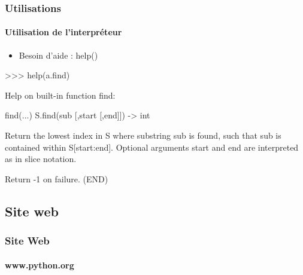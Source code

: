 \begin{frame}[fragile]
\frametitle{Utilisations}
\framesubtitle{Utilisation de l'interpréteur}
\begin{itemize}
 \item Besoin d'aide : help()
\end{itemize}
\begin{pythonConsole}
>>> help(a.find)

Help on built-in function find:

find(...)
    S.find(sub [,start [,end]]) -> int
    
    Return the lowest index in S where substring sub is found,
    such that sub is contained within S[start:end].  Optional
    arguments start and end are interpreted as in slice notation.
    
    Return -1 on failure.
(END) 
\end{pythonConsole}
\end{frame}
\subsection{Site web}
\begin{frame}
\frametitle{Site Web}
\framesubtitle{www.python.org}
\end{frame}
